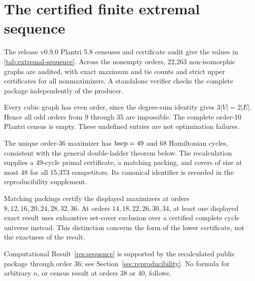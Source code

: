 \section{The certified finite extremal sequence}
\label{sec:sequence}

\begin{computationalresult}
\label{res:sequence}
The release v0.9.0 Plantri 5.8 censuses and certificate audit give the values in
\cref{tab:extremal-sequence}.  Across the nonempty orders, 22,263
non-isomorphic graphs are audited, with exact maximum and tie counts and strict
upper certificates for all nonmaximizers.  A standalone verifier checks the
complete package independently of the producer.
\end{computationalresult}

\begin{table}[htbp]
\centering
\caption{Recalculated Barnette Hamiltonian edge-separation extrema through
order 36.  The last column is the number of undirected Hamiltonian cycles in
each maximizer; within every tied order all maximizers have the displayed
count.}
\label{tab:extremal-sequence}

\end{table}

Every cubic graph has even order, since the degree-sum identity gives
\(3|V|=2|E|\).  Hence all odd orders from 9 through 35 are impossible.  The
complete order-10 Plantri census is empty.  These undefined entries are not
optimization failures.

The unique order-36 maximizer has \(\operatorname{hsep}=49\) and 68
Hamiltonian cycles, consistent with the general double-ladder theorem below.
The recalculation supplies a 49-cycle primal certificate, a matching packing,
and covers of size at most 48 for all 15,373 competitors.  Its canonical
identifier is recorded in the reproducibility supplement.

Matching packings certify the displayed maximizers at orders
\(8,12,16,20,24,28,32,36\).  At orders \(14,18,22,26,30,34\), at least one
displayed exact result uses exhaustive set-cover exclusion over a certified
complete cycle universe instead.  This distinction concerns the form of the
lower certificate, not the exactness of the result.

\begin{statusnote}
Computational Result~\ref{res:sequence} is supported by the recalculated public
package through order 36; see Section~\ref{sec:reproducibility}.  No formula for
arbitrary \(n\), or census result at orders 38 or 40, follows.
\end{statusnote}
